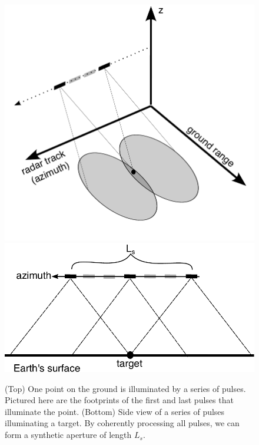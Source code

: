

\begin{figure}
	\label{fig:ch2-synth-aper}
	\centering
	\includegraphics[width=0.8\linewidth]{figures/chapter2-sar/synth-aper2.pdf}
	\includegraphics[width=0.99\linewidth]{figures/chapter2-sar/sar-synthetic-aperture.pdf}
	\caption[Formation of a synthetic aperture]{
		(Top) One point on the ground is illuminated by a series of pulses. Pictured here are the footprints of the first and last pulses that illuminate the point. 
		(Bottom) Side view of a series of pulses illuminating a target. By coherently processing all pulses, we can form a synthetic aperture of length $L_s$.
	}
\end{figure}



